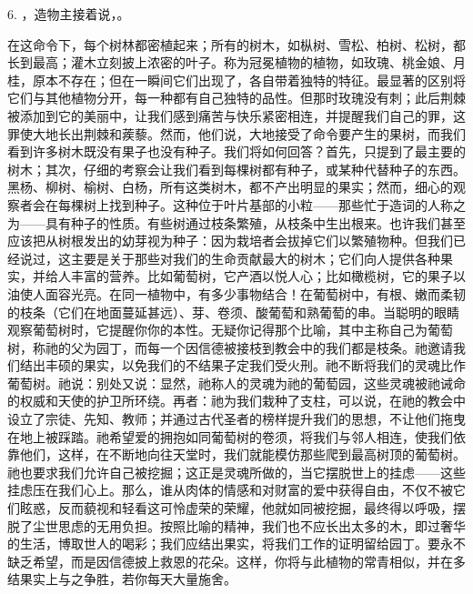 6. ，造物主接着说，。\par

在这命令下，每个树林都密植起来；所有的树木，如枞树、雪松、柏树、松树，都长到最高；灌木立刻披上浓密的叶子。称为冠冕植物的植物，如玫瑰、桃金娘、月桂，原本不存在；但在一瞬间它们出现了，各自带着独特的特征。最显著的区别将它们与其他植物分开，每一种都有自己独特的品性。但那时玫瑰没有刺；此后荆棘被添加到它的美丽中，让我们感到痛苦与快乐紧密相连，并提醒我们自己的罪，这罪使大地长出荆棘和蒺藜。然而，他们说，大地接受了命令要产生的果树，而我们看到许多树木既没有果子也没有种子。我们将如何回答？首先，只提到了最主要的树木；其次，仔细的考察会让我们看到每棵树都有种子，或某种代替种子的东西。黑杨、柳树、榆树、白杨，所有这类树木，都不产出明显的果实；然而，细心的观察者会在每棵树上找到种子。这种位于叶片基部的小粒——那些忙于造词的人称之为——具有种子的性质。有些树通过枝条繁殖，从枝条中生出根来。也许我们甚至应该把从树根发出的幼芽视为种子：因为栽培者会拔掉它们以繁殖物种。但我们已经说过，这主要是关于那些对我们的生命贡献最大的树木；它们向人提供各种果实，并给人丰富的营养。比如葡萄树，它产酒以悦人心；比如橄榄树，它的果子以油使人面容光亮。在同一植物中，有多少事物结合！在葡萄树中，有根、嫩而柔韧的枝条（它们在地面蔓延甚远）、芽、卷须、酸葡萄和熟葡萄的串。当聪明的眼睛观察葡萄树时，它提醒你你的本性。无疑你记得那个比喻，其中主称自己为葡萄树，称祂的父为园丁，而每一个因信德被接枝到教会中的我们都是枝条。祂邀请我们结出丰硕的果实，以免我们的不结果子定我们受火刑。祂不断将我们的灵魂比作葡萄树。祂说：别处又说：显然，祂称人的灵魂为祂的葡萄园，这些灵魂被祂诫命的权威和天使的护卫所环绕。再者：祂为我们栽种了支柱，可以说，在祂的教会中设立了宗徒、先知、教师；并通过古代圣者的榜样提升我们的思想，不让他们拖曳在地上被踩踏。祂希望爱的拥抱如同葡萄树的卷须，将我们与邻人相连，使我们依靠他们，这样，在不断地向往天堂时，我们就能模仿那些爬到最高树顶的葡萄树。祂也要求我们允许自己被挖掘；这正是灵魂所做的，当它摆脱世上的挂虑——这些挂虑压在我们心上。那么，谁从肉体的情感和对财富的爱中获得自由，不仅不被它们眩惑，反而藐视和轻看这可怜虚荣的荣耀，他就如同被挖掘，最终得以呼吸，摆脱了尘世思虑的无用负担。按照比喻的精神，我们也不应长出太多的木，即过奢华的生活，博取世人的喝彩；我们应结出果实，将我们工作的证明留给园丁。要永不缺乏希望，而是因信德披上救恩的花朵。这样，你将与此植物的常青相似，并在多结果实上与之争胜，若你每天大量施舍。\par

